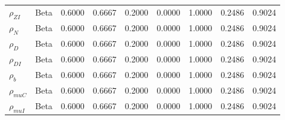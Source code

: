 \begin{center}
\begin{longtable}{lcccccccc}
$ {\rho_{ZI}} $ & Beta & 0.6000 & 0.6667 & 0.2000 & 0.0000 & 1.0000 & 0.2486 & 0.9024 \\ 
$ {\rho_N} $ & Beta & 0.6000 & 0.6667 & 0.2000 & 0.0000 & 1.0000 & 0.2486 & 0.9024 \\ 
$ {\rho_D} $ & Beta & 0.6000 & 0.6667 & 0.2000 & 0.0000 & 1.0000 & 0.2486 & 0.9024 \\ 
$ {\rho_{DI}} $ & Beta & 0.6000 & 0.6667 & 0.2000 & 0.0000 & 1.0000 & 0.2486 & 0.9024 \\ 
$ {\rho_b} $ & Beta & 0.6000 & 0.6667 & 0.2000 & 0.0000 & 1.0000 & 0.2486 & 0.9024 \\ 
$ {\rho_{muC}} $ & Beta & 0.6000 & 0.6667 & 0.2000 & 0.0000 & 1.0000 & 0.2486 & 0.9024 \\ 
$ {\rho_{muI}} $ & Beta & 0.6000 & 0.6667 & 0.2000 & 0.0000 & 1.0000 & 0.2486 & 0.9024 \\ 
\end{longtable}
 \end{center}
